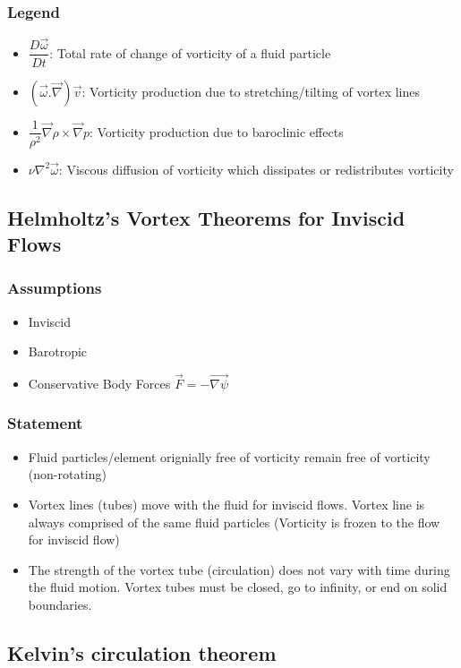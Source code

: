 \documentclass[10pt, letterpaper, notitlepage, landscape]{article}
\begin{document}
\subsubsection{Legend}
\begin{itemize}
\item $\dfrac{D\vec{\omega}}{Dt}$: Total rate of change of vorticity of a fluid particle
\item $(\vec{\omega}.\vec{\nabla}) \vec{v}$: Vorticity production due to stretching/tilting of vortex lines
\item $\dfrac{1}{\rho^2} \vec{\nabla} \rho \times \vec{\nabla} p$: Vorticity production due to baroclinic effects
\item $\nu \nabla^2 \vec{\omega}$: Viscous diffusion of vorticity which dissipates or redistributes vorticity
\end{itemize}

\subsection{Helmholtz's Vortex Theorems for Inviscid Flows}
\subsubsection{Assumptions}
\begin{itemize}
\item Inviscid
\item Barotropic
\item Conservative Body Forces $\vec{F} = -\vec{\nabla{\psi}}$
\end{itemize}

\subsubsection{Statement}
\begin{itemize}
\item Fluid particles/element orignially free of vorticity remain free of vorticity (non-rotating)
\item Vortex lines (tubes) move with the fluid for inviscid flows. Vortex line is always comprised of the same fluid particles (Vorticity is frozen to the flow for inviscid flow)
\item The strength of the vortex tube (circulation) does not vary with time during the fluid motion. Vortex tubes must be closed, go to infinity, or end on solid boundaries.
\end{itemize}

\subsection{Kelvin's circulation theorem}
\end{document}
